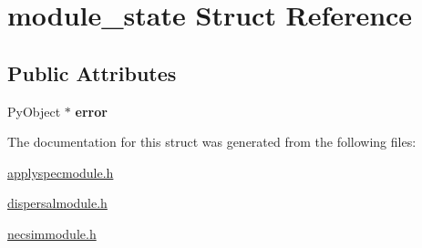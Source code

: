 \hypertarget{structmodule__state}{}\section{module\+\_\+state Struct Reference}
\label{structmodule__state}
\subsection*{Public Attributes}
\begin{DoxyCompactItemize}
\item 
Py\+Object $\ast$ {\bfseries error}\hypertarget{structmodule__state_a6593da300121fe46fad3e7280053fab8}{}\label{structmodule__state_a6593da300121fe46fad3e7280053fab8}

\end{DoxyCompactItemize}


The documentation for this struct was generated from the following files\+:\begin{DoxyCompactItemize}
\item 
\hyperlink{applyspecmodule_8h}{applyspecmodule.\+h}\item 
\hyperlink{dispersalmodule_8h}{dispersalmodule.\+h}\item 
\hyperlink{necsimmodule_8h}{necsimmodule.\+h}\end{DoxyCompactItemize}
